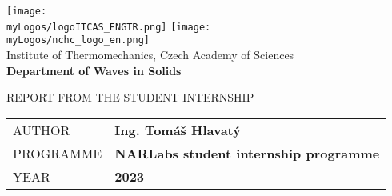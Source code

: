 \thispagestyle{empty}




\begin{titlepage}


\texttt{[image: \\myLogos/logoITCAS\_ENGTR.png]}\hspace{4cm}
\texttt{[image: \\myLogos/nchc\_logo\_en.png]} \\[0.3cm]

\color{black!60}\Large\textsf{Institute of Thermomechanics, Czech Academy of Sciences}\\[0.3cm]
\color{black}
{\fontsize{16}{60}\selectfont \textbf{{\textsf{Department of Waves in Solids}}}\\[0.3cm]}
\vfill

{\fontsize{35}{60}}

{{\Large \textsf{REPORT FROM THE STUDENT INTERNSHIP}}\\[0.4cm]}

\vfill

\begin{tabular}{p{}|p{}}
\textsf{\small\color{chaptergrey}AUTHOR}         &   \textbf{\Large\textsf{Ing. Tomáš Hlavatý}}\\[0.1cm]
\textsf{\small\color{chaptergrey}PROGRAMME}    &   \textbf{\Large\textsf{NARLabs student internship programme}}\\[0.1cm]
\textsf{\small\color{chaptergrey}YEAR}           &   \textbf{\Large\textsf{2023}}
\end{tabular}

\end{titlepage}

